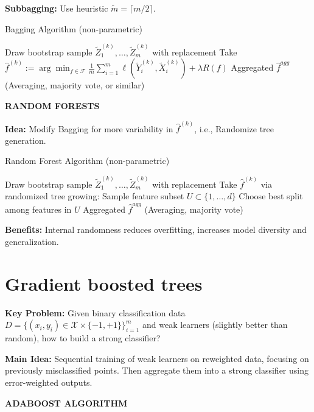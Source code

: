 \documentclass[a4paper,10pt]{article}
\newcommand{\subtitle}[1]{\vspace{0.25cm}\begin{normalsize}\textbf{\textcolor{gray!150}{\uppercase{#1}}}\end{normalsize}}
\begin{document}
\begin{small}
\textbf{Subbagging:} Use heuristic $\tilde{m} = \lceil m / 2 \rceil$.

\begin{algorithm}[H]
\footnotesize
\caption{Bagging Algorithm (non-parametric)}
\begin{algorithmic}[1]
    \State Draw bootstrap sample $\tilde{Z}_1^{(k)},\ldots,\tilde{Z}_m^{(k)}$ with replacement
    \State Take $\hat{f}^{(k)} := \arg \min_{f \in \mathcal{F}} \frac{1}{m} \sum_{i=1}^m \ell(\tilde{Y}_i^{(k)}, \tilde{X}_i^{(k)}) + \lambda R(f)$
\EndFor
\State \Return Aggregated $\hat{f}^{agg}$ (Averaging, majority vote, or similar)
\end{algorithmic}
\end{algorithm}

\subtitle{Random Forests}

\textbf{Idea:} Modify Bagging for more variability in $\hat{f}^{(k)}$, i.e., Randomize tree generation.

\begin{algorithm}[H]
\footnotesize
\caption{Random Forest Algorithm (non-parametric)}
\begin{algorithmic}[1]
\State Draw bootstrap sample $\tilde{Z}_1^{(k)},\ldots,\tilde{Z}_m^{(k)}$ with replacement
\State Take $\hat{f}^{(k)}$ via randomized tree growing:
\State \quad Sample feature subset $U \subset \{1,\ldots,d\}$
\State \quad Choose best split among features in $U$
\EndFor
\State \Return Aggregated $\hat{f}^{agg}$ (Averaging, majority vote)
\end{algorithmic}
\end{algorithm}

\textbf{Benefits:}  Internal randomness reduces overfitting, increases model diversity and generalization.
\newpage


\section{Gradient boosted trees}

\textbf{Key Problem:} Given binary classification data $D = \{(x_i, y_i) \in \mathcal{X} \times \{-1,+1\}\}_{i=1}^m$ and weak learners (slightly better than random), how to build a strong classifier?

\textbf{Main Idea:} Sequential training of weak learners on reweighted data, focusing on previously misclassified points. Then aggregate them into a strong classifier using error-weighted outputs.

\subtitle{AdaBoost Algorithm}


\end{small}
\end{document}
